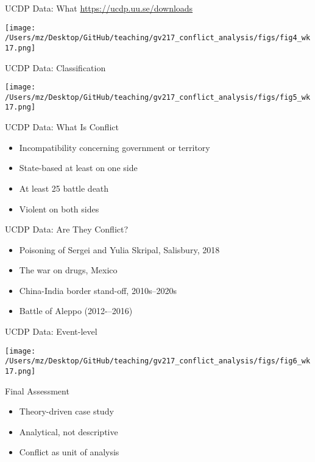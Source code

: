 \documentclass{beamer}
\begin{document}
\begin{frame}{UCDP Data: What}
    \pause\url{https://ucdp.uu.se/downloads}
    \pause
    \begin{center}
        \texttt{[image: /Users/mz/Desktop/GitHub/teaching/gv217\_conflict\_analysis/figs/fig4\_wk17.png]}
    \end{center}
\end{frame}

\begin{frame}{UCDP Data: Classification}
    \pause
    \begin{center}
        \texttt{[image: /Users/mz/Desktop/GitHub/teaching/gv217\_conflict\_analysis/figs/fig5\_wk17.png]}
    \end{center}
\end{frame}

\begin{frame}{UCDP Data: What Is Conflict}
    \begin{itemize}
        \pause\item Incompatibility concerning government or territory
        \pause\item State-based at least on one side
        \pause\item At least 25 battle death
        \pause\item Violent on both sides
    \end{itemize}
\end{frame}

\begin{frame}{UCDP Data: Are They Conflict?}
    \begin{itemize}
        \pause\item Poisoning of Sergei and Yulia Skripal, Salisbury, 2018
        \pause\item The war on drugs, Mexico
        \pause\item China-India border stand-off, 2010s--2020s
        \pause\item Battle of Aleppo (2012-–2016)
    \end{itemize}
\end{frame}

\begin{frame}{UCDP Data: Event-level}
    \pause
    \begin{center}
        \texttt{[image: /Users/mz/Desktop/GitHub/teaching/gv217\_conflict\_analysis/figs/fig6\_wk17.png]}
    \end{center}
\end{frame}

\begin{frame}{Final Assessment}
    \begin{itemize}
        \pause\item Theory-driven case study
        \pause\item Analytical, not descriptive
        \pause\item Conflict as unit of analysis
    \end{itemize}
\end{frame}
\end{document}
